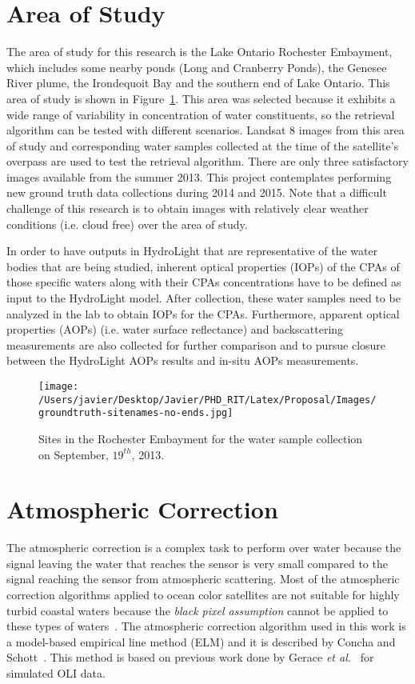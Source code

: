 \documentclass{article}
\begin{document}
\section{Area of Study}
The area of study for this research is the Lake Ontario Rochester Embayment, which includes some nearby ponds (Long and Cranberry Ponds), the Genesee River plume, the Irondequoit Bay and the southern end of Lake Ontario. This area of study is shown in Figure~\ref{fig:0910913Sites}. This area was selected because it exhibits a wide range of variability in concentration of water constituents, so the retrieval algorithm can be tested with different scenarios. Landsat 8 images from this area of study and corresponding water samples collected at the time of the satellite's overpass are used to test the retrieval algorithm. There are only three satisfactory images available from the summer 2013. This project contemplates performing new ground truth data collections during 2014 and 2015. Note that a difficult challenge of this research is to obtain images with relatively clear weather conditions (i.e. cloud free) over the area of study.

In order to have outputs in HydroLight that are representative of the water bodies that are being studied, inherent optical properties (IOPs) of the CPAs of those specific waters along with their CPAs concentrations have to be defined as input to the HydroLight model. After collection, these water samples need to be analyzed in the lab to obtain IOPs for the CPAs. Furthermore, apparent optical properties (AOPs) (i.e. water surface reflectance) and backscattering measurements are also collected for further comparison and to pursue closure between the HydroLight AOPs results and in-situ AOPs measurements.
\begin{figure}[htb]
  \centering
  \texttt{[image: /Users/javier/Desktop/Javier/PHD\_RIT/Latex/Proposal/Images/groundtruth-sitenames-no-ends.jpg]}
  \caption{Sites in the Rochester Embayment for the water sample collection on September, $19^{th}$, 2013.\label{fig:0910913Sites} } 
\end{figure}
\section{Atmospheric Correction}
The atmospheric correction is a complex task to perform over water because the signal leaving the water that reaches the sensor is very small compared to the signal reaching the sensor from atmospheric scattering. Most of the atmospheric correction algorithms applied to ocean color satellites are not suitable for highly turbid coastal waters because the {\it black pixel assumption} cannot be applied to these types of waters~\cite{Patt2003}. The atmospheric correction algorithm used in this work is a model-based empirical line method (ELM) and it is described by Concha and Schott~\cite{Concha2014SPIE}. This method is based on previous work done by Gerace {\it et al.}~\cite{Gerace:2013,Gerace:2012}  for simulated OLI data. 
\end{document}
